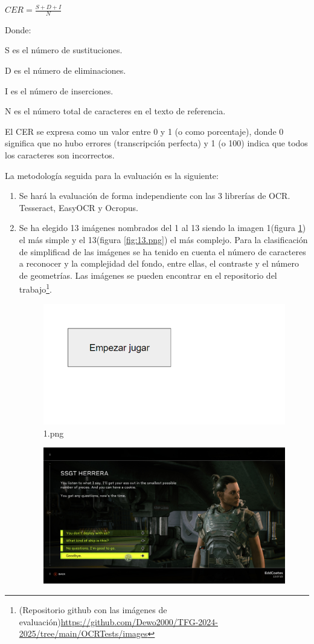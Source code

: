 $CER = \frac{S+D+I}{N} $ 

Donde:

S es el número de sustituciones.

D es el número de eliminaciones.

I es el número de inserciones.

N es el número total de caracteres en el texto de referencia.

El CER se expresa como un valor entre 0 y 1 (o como porcentaje), donde 0 significa que no hubo errores (transcripción perfecta) y 1 (o 100) indica que todos los caracteres son incorrectos.

La metodología seguida para la evaluación es la siguiente:

\begin{enumerate}
	\item Se hará la evaluación de forma independiente con las 3 librerías de OCR. Tesseract, EasyOCR y Ocropus.
	\item Se ha elegido 13 imágenes nombrados del 1 al 13 siendo la imagen 1(figura \ref{fig:1.png}) el más simple y el 13(figura \ref{fig:13.png}) el más complejo. Para la clasificación de simplificad de las imágenes se ha tenido en cuenta el número de caracteres a reconocer y la complejidad del fondo, entre ellas, el contraste y el número de geometrías.
	Las imágenes se pueden encontrar en el repositorio del trabajo\footnote{(Repositorio github con las imágenes de evaluación)\url{https://github.com/Dewo2000/TFG-2024-2025/tree/main/OCRTests/images}}.
	\begin{figure}[H]
		\centering
		\includegraphics[width = 1\textwidth]{Imagenes/Evaluacion_OCR/1.png}
		\caption{1.png}
		\label{fig:1.png}
	\end{figure}
	\begin{figure}[H]
		\centering
		\includegraphics[width = 1\textwidth]{Imagenes/Evaluacion_OCR/13.png}

\end{figure}
\end{enumerate}
